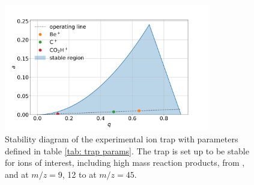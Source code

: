 \begin{figure}[H]
	\centering
	\includegraphics[width=0.8\textwidth]{images/stability.png}
	\caption{Stability diagram of the experimental ion trap with parameters defined in table \ref{tab: trap params}. The trap is set up to be stable for ions of interest, including high mass reaction products, from , and  at $m/z=$9, 12 to  at $m/z=45$.}
	\label{fig: stability}
\end{figure}

%
%
